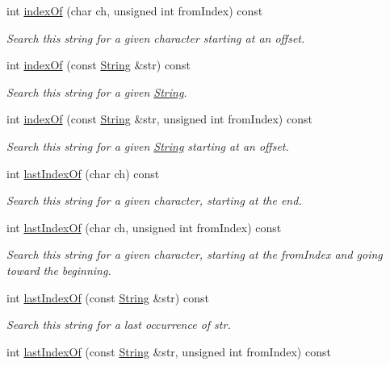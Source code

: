 \begin{DoxyCompactItemize}
int \hyperlink{class_string_a0a9cb3d76e6e9b7cd1d8666cc84149ea}{index\+Of} (char ch, unsigned int from\+Index) const
\begin{DoxyCompactList}\small\item\em Search this string for a given character starting at an offset. \end{DoxyCompactList}\item 
int \hyperlink{class_string_ab2fac51c5e56215d0b92a70cce39d966}{index\+Of} (const \hyperlink{class_string}{String} \&str) const
\begin{DoxyCompactList}\small\item\em Search this string for a given \hyperlink{class_string}{String}. \end{DoxyCompactList}\item 
int \hyperlink{class_string_aecbe2471a60329e53d31bd85c24c38a9}{index\+Of} (const \hyperlink{class_string}{String} \&str, unsigned int from\+Index) const
\begin{DoxyCompactList}\small\item\em Search this string for a given \hyperlink{class_string}{String} starting at an offset. \end{DoxyCompactList}\item 
int \hyperlink{class_string_a63a465c7d1e67129b04cf4693b756e5b}{last\+Index\+Of} (char ch) const
\begin{DoxyCompactList}\small\item\em Search this string for a given character, starting at the end. \end{DoxyCompactList}\item 
int \hyperlink{class_string_af9b32bb5cf68844c04792b4368f69883}{last\+Index\+Of} (char ch, unsigned int from\+Index) const
\begin{DoxyCompactList}\small\item\em Search this string for a given character, starting at the from\+Index and going toward the beginning. \end{DoxyCompactList}\item 
int \hyperlink{class_string_aa696010f90d06e0caceeb847ab3ce689}{last\+Index\+Of} (const \hyperlink{class_string}{String} \&str) const
\begin{DoxyCompactList}\small\item\em Search this string for a last occurrence of str. \end{DoxyCompactList}\item 
int \hyperlink{class_string_a08e7c60202cc42fe4731b52c0c5cd80f}{last\+Index\+Of} (const \hyperlink{class_string}{String} \&str, unsigned int from\+Index) const

\end{DoxyCompactItemize}
